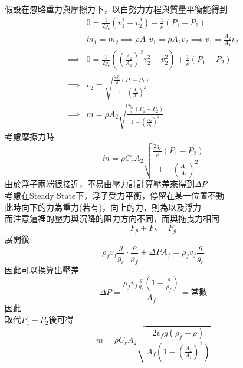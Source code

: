 \documentclass[../main.tex]{subfiles}
\begin{document}
\begin{itemize}
\begin{itemize}
    假設在忽略重力與摩擦力下，以白努力方程與質量平衡能得到
    \begin{align}
    & 0 = \frac{1}{2g_c} \left(v_1^2 - v_2^2\right) + \frac{1}{\rho} (P_1 - P_2) \nonumber\\
    & \dot m_1 = \dot m_2 \implies \rho A_1 v_1 = \rho A_2 v_2 \implies v_1 = \frac{A_2}{A_1} v_2 \nonumber\\
    \implies & 0 = \frac{1}{2g_c} \left(
      \left(
        \frac{A_2}{A_1}
      \right)^2 v_2^2 - v_2^2
    \right) + \frac{1}{\rho} (P_1 - P_2) \nonumber\\
    \implies & v_2 = \sqrt{\frac{\frac{2g_c}{\rho} (P_1 - P_2)}{1 - \left(
      \frac{A_2}{A_1}
    \right)^2}} \nonumber\\
    \implies & \dot m = \rho A_2 \sqrt{\frac{\frac{2g_c}{\rho} (P_1 - P_2)}{1 - \left(
      \frac{A_2}{A_1}
    \right)^2}}
    \end{align}
    考慮摩擦力時
    \begin{equation}
      \dot m = \rho \boxed{C_r} A_2 \sqrt{\frac{\frac{2g_c}{\rho} (P_1 - P_2)}{1 - \left(
        \frac{A_2}{A_1}
      \right)^2}}
    \end{equation}
    由於浮子兩端很接近，不易由壓力計計算壓差來得到$\Delta P$\\
    考慮在Steady State下，浮子受力平衡，停留在某一位置不動\\
    此時向下的力為重力(若有)，向上的力，則為以及浮力\\
    而注意這裡的壓力與沉降的阻力方向不同，而與拖曳力相同
    \begin{equation}
      F_p + F_b = F_g
    \end{equation}
    展開後:
    \begin{equation}
      \rho_f v_f \frac{g}{g_c}\cdot \frac{\rho}{\rho_f} + \Delta P A_f 
      = \rho_f v_f \frac{g}{g_c}
    \end{equation}
    因此可以換算出壓差
    \begin{equation}
      \Delta P = \frac{\rho_f v_f \frac{g}{g_c} \left(
        1 - \frac{\rho}{\rho_f}
      \right)}{A_f} = \text{常數}
    \end{equation}
    因此\\
    取代$P_1 - P_2$後可得
    \begin{equation}
      \boxed{
        \dot m = \rho C_r A_2 \sqrt{\frac{2 v_f g\left(\rho_f - \rho\right)}{A_f\left(
          1 - \left(
            \frac{A_2}{A_1}
          \right)^2
        \right)}}}
    \end{equation}
  \end{itemize}
\end{itemize}
\end{document}
